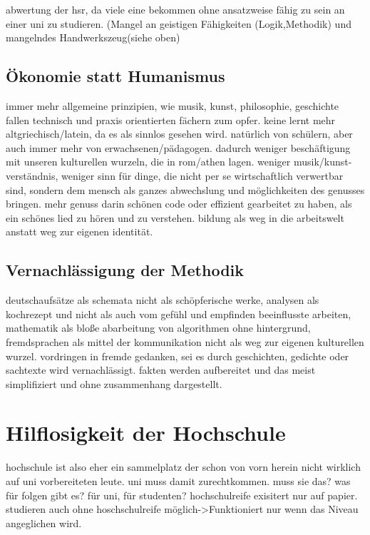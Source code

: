 \documentclass[a4paper,10pt,twoside,titlepage]{article}
\begin{document}
abwertung der hsr, da viele eine bekommen ohne ansatzweise fähig zu sein an einer uni zu studieren. (Mangel an geistigen Fähigkeiten (Logik,Methodik) und mangelndes Handwerkszeug(siehe oben)  

\subsection{Ökonomie statt Humanismus}
immer mehr allgemeine prinzipien, wie musik, kunst, philosophie, geschichte fallen technisch und praxis orientierten fächern zum opfer. keine lernt mehr altgriechisch/latein, da es als sinnlos gesehen wird. natürlich von schülern, aber auch immer mehr von erwachsenen/pädagogen. dadurch weniger beschäftigung mit unseren kulturellen wurzeln, die in rom/athen lagen. weniger musik/kunst-verständnis, weniger sinn für dinge, die nicht per se wirtschaftlich verwertbar sind, sondern dem mensch als ganzes abwechslung und möglichkeiten des genusses bringen. mehr genuss darin schönen code oder effizient gearbeitet zu haben, als ein schönes lied zu hören und zu verstehen. bildung als weg in die arbeitswelt anstatt weg zur eigenen identität.


\subsection{Vernachlässigung der Methodik}
deutschaufsätze als schemata nicht als schöpferische werke, analysen als kochrezept und nicht als auch vom gefühl und empfinden beeinflusste arbeiten, mathematik als bloße abarbeitung von algorithmen ohne hintergrund, fremdsprachen als mittel der kommunikation nicht als weg zur eigenen kulturellen wurzel. vordringen in fremde gedanken, sei es durch geschichten, gedichte oder sachtexte wird vernachlässigt. fakten werden aufbereitet und das meist simplifiziert und ohne zusammenhang dargestellt. 

\section{Hilflosigkeit der Hochschule}
hochschule ist also eher ein sammelplatz der schon von vorn herein nicht wirklich auf uni vorbereiteten leute. uni muss damit zurechtkommen. muss sie das? was für folgen gibt es? für uni, für studenten? hochschulreife exisitert nur auf papier. studieren auch ohne hoschschulreife möglich->Funktioniert nur wenn das Niveau angeglichen wird. 
\end{document}
